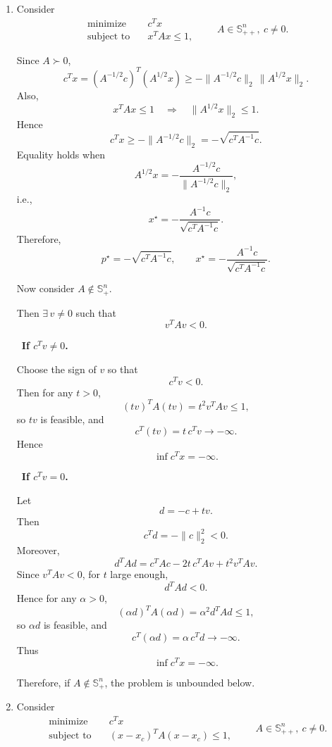 \documentclass[11pt,letter,notitlepage]{article}
\theoremstyle{definition}
\begin{document}
\newpage

\begin{solution}
\leavevmode\vspace{-2em}
\begin{enumerate}[label=(\alph*)]

\item
Consider
\[
\begin{aligned}
\text{minimize}\quad & c^T x\\
\text{subject to}\quad & x^T A x\le 1,
\end{aligned}
\qquad A\in\mathbb S_{++}^n,\ c\neq 0.
\]

Since \(A\succ 0\),
\[
c^T x
=
(A^{-1/2}c)^T(A^{1/2}x)
\ge
-\|A^{-1/2}c\|_2\,\|A^{1/2}x\|_2.
\]
Also,
\[
x^T A x\le 1
\quad\Longrightarrow\quad
\|A^{1/2}x\|_2\le 1.
\]
Hence
\[
c^T x\ge -\|A^{-1/2}c\|_2
= -\sqrt{c^T A^{-1}c}.
\]
Equality holds when
\[
A^{1/2}x
=
-\frac{A^{-1/2}c}{\|A^{-1/2}c\|_2},
\]
i.e.,
\[
x^\star
=
-\frac{A^{-1}c}{\sqrt{c^T A^{-1}c}}.
\]
Therefore,
\[
p^\star=-\sqrt{c^T A^{-1}c},
\qquad
x^\star
=
-\frac{A^{-1}c}{\sqrt{c^T A^{-1}c}}.
\]

\medskip

Now consider \(A\notin\mathbb S_+^n\).

Then \(\exists\,v\neq 0\) such that
\[
v^TAv<0.
\]

\ \textbf{If \(c^Tv\neq 0\).}

Choose the sign of \(v\) so that
\[
c^Tv<0.
\]
Then for any \(t>0\),
\[
(tv)^T A (tv)=t^2 v^TAv\le 1,
\]
so \(tv\) is feasible, and
\[
c^T(tv)=t\,c^Tv\to -\infty.
\]
Hence
\[
\inf c^T x=-\infty.
\]

\ \textbf{If \(c^Tv=0\).}

Let
\[
d=-c+t v.
\]
Then
\[
c^T d=-\|c\|_2^2<0.
\]
Moreover,
\[
d^T A d
=
c^T A c-2t\,c^TAv+t^2 v^TAv.
\]
Since \(v^TAv<0\), for \(t\) large enough,
\[
d^TAd<0.
\]
Hence for any \(\alpha>0\),
\[
(\alpha d)^T A (\alpha d)=\alpha^2 d^TAd\le 1,
\]
so \(\alpha d\) is feasible, and
\[
c^T(\alpha d)=\alpha\, c^Td\to -\infty.
\]
Thus
\[
\inf c^T x=-\infty.
\]

Therefore, if \(A\notin\mathbb S_+^n\), the problem is unbounded below.

\medskip

\item
Consider
\[
\begin{aligned}
\text{minimize}\quad & c^T x\\
\text{subject to}\quad & (x-x_c)^T A (x-x_c)\le 1,
\end{aligned}
\qquad A\in\mathbb S_{++}^n,\ c\neq 0.
\]


\end{enumerate}
\end{solution}
\end{document}
